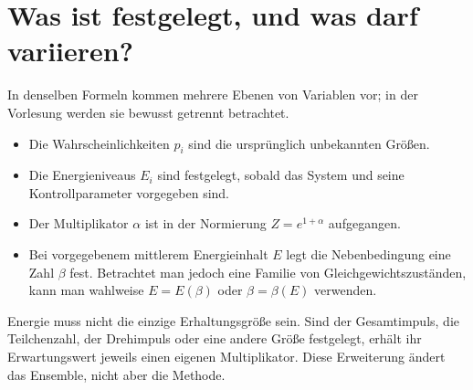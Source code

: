 \section{Was ist festgelegt, und was darf variieren?}

In denselben Formeln kommen mehrere Ebenen von Variablen vor; in der Vorlesung werden sie bewusst getrennt betrachtet.

\begin{itemize}
 \item Die Wahrscheinlichkeiten \(p_i\) sind die ursprünglich unbekannten Größen.
 \item Die Energieniveaus \(E_i\) sind festgelegt, sobald das System und seine Kontrollparameter vorgegeben sind.
 \item Der Multiplikator \(\alpha\) ist in der Normierung \(Z=e^{1+\alpha}\) aufgegangen.
 \item Bei vorgegebenem mittlerem Energieinhalt \(E\) legt die Nebenbedingung eine Zahl \(\beta\) fest. Betrachtet man jedoch eine Familie von Gleichgewichtszuständen, kann man wahlweise \(E=E(\beta)\) oder \(\beta=\beta(E)\) verwenden.
\end{itemize}

\begin{classroomqa}
\end{classroomqa}

\begin{classroomqa}
\end{classroomqa}

Energie muss nicht die einzige Erhaltungsgröße sein. Sind der Gesamtimpuls, die Teilchenzahl, der Drehimpuls oder eine andere Größe festgelegt, erhält ihr Erwartungswert jeweils einen eigenen Multiplikator. Diese Erweiterung ändert das Ensemble, nicht aber die Methode.


